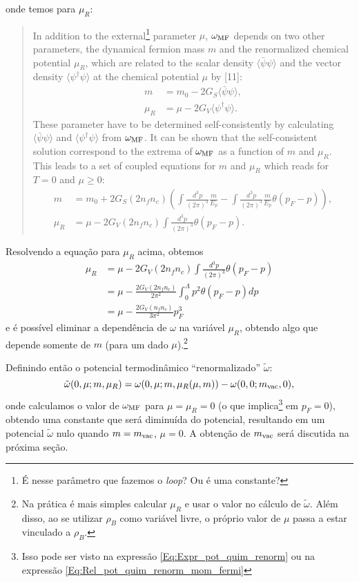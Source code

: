 %
onde temos para $\mu_R$:
\begin{quote}
	In addition to the external\footnote{É nesse parâmetro que fazemos o \emph{loop}? Ou é uma constante?} parameter $\mu$, $\omega_{\rm{MF}}$ depends on two other parameters, the dynamical fermion mass $m$ and the renormalized chemical potential $\mu_R$, which are related to the scalar density $\langle\bar{\psi}\psi\rangle$ and the vector density $\langle\psi^\dagger\psi\rangle$ at the chemical potential $\mu$ by [11]:
	\begin{align}
		m &= m_0 - 2G_S\langle\bar{\psi}\psi\rangle, \label{Eq:Eq_Gap_Buballa_1}\\
		\mu_R &= \mu - 2G_V\langle\psi^\dagger\psi\rangle. \label{Eq:Eq_Gap_Pot_Quim_Renorm}
	\end{align}
	These parameter have to be determined self-consistently by calculating $\langle\bar{\psi}\psi\rangle$ and $\langle\psi^\dagger\psi\rangle$ from $\omega_{\rm{MF}}$. It can be shown that the self-consistent solution correspond to the extrema of $\omega_{\rm{MF}}$ as a function of $m$ and $\mu_R$. This leads to a set of coupled equations for $m$ and $\mu_R$ which reads for $T = 0$ and $\mu \geqslant 0$:
\begin{align}
	m &= m_0 + 2G_S(2n_fn_c)\left(\int \frac{d^3p}{(2\pi)^3} \frac{m}{E_p} - \int \frac{d^3p}{(2\pi)^3}\frac{m}{E_p}\theta(p_F - p)\right), \label{Eq:Eq_Gap_Buballa_2}\\
	\mu_R &= \mu - 2G_V(2n_fn_c)\int\frac{d^3p}{(2\pi)^3}\theta(p_F - p).
\end{align}
\end{quote}

Resolvendo a equação para $\mu_R$ acima, obtemos
\begin{align}
	\mu_R &= \mu - 2G_V(2n_fn_c)\int\frac{d^3p}{(2\pi)^3}\theta(p_F - p) \\
	&= \mu - \frac{2G_V(2n_fn_c)}{2\pi^2}\int_0^\Lambda p^2 \theta(p_F - p) dp \\
	&= \mu - \frac{2G_V(n_fn_c)}{3\pi^2}p_F^3 \label{Eq:Expr_pot_quim_renorm}
\end{align}
%
e é possível eliminar a dependência de $\omega$ na variável $\mu_R$, obtendo algo que depende somente de $m$ (para um dado $\mu$).\footnote{Na prática é mais simples calcular $\mu_R$ e usar o valor no cálculo de $\tilde{\omega}$. Além disso, ao se utilizar $\rho_B$ como variável livre, o próprio valor de $\mu$ passa a estar vinculado a $\rho_B$.}

Definindo então o potencial termodinâmico ``renormalizado'' $\tilde\omega$:
\begin{equation}\label{Eq:Def_omega_tilde}
	\tilde{\omega}(0,\mu;m,\mu_R) = \omega(0,\mu; m, \mu_R(\mu,m)) - \omega(0,0; m_{\rm{vac}}, 0),
\end{equation}
%
onde calculamos o valor de $\omega_{\rm{MF}}$ para $\mu = \mu_R = 0$ (o que implica\footnote{Isso pode ser visto na expressão \eqref{Eq:Expr_pot_quim_renorm} ou na expressão \eqref{Eq:Rel_pot_quim_renorm_mom_fermi}} em $p_F = 0$), obtendo uma constante que será diminuída do potencial, resultando em um potencial $\tilde\omega$ nulo quando $m = m_{\rm{vac}}$, $\mu = 0$. A obtenção de $m_{\rm{vac}}$ será discutida na próxima seção.

